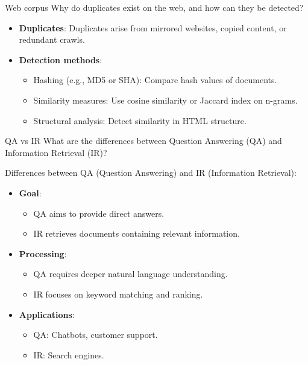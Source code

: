 \documentclass{article}
\begin{document}
\begin{exercise}{Web corpus}
  Why do duplicates exist on the web, and how can they be detected?

  \begin{solution}
    \begin{itemize}
        \item \textbf{Duplicates}: Duplicates arise from mirrored websites, copied content, or redundant crawls.
        \item \textbf{Detection methods}:
        \begin{itemize}
            \item Hashing (e.g., MD5 or SHA): Compare hash values of documents.
            \item Similarity measures: Use cosine similarity or Jaccard index on n-grams.
            \item Structural analysis: Detect similarity in HTML structure.
        \end{itemize}
    \end{itemize}
  \end{solution}
\end{exercise}

\begin{exercise}{QA vs IR}
  What are the differences between Question Answering (QA) and Information Retrieval (IR)?

  \begin{solution}
    Differences between QA (Question Answering) and IR (Information Retrieval):
    \begin{itemize}
        \item \textbf{Goal}:
        \begin{itemize}
            \item QA aims to provide direct answers.
            \item IR retrieves documents containing relevant information.
        \end{itemize}
        \item \textbf{Processing}:
        \begin{itemize}
            \item QA requires deeper natural language understanding.
            \item IR focuses on keyword matching and ranking.
        \end{itemize}
        \item \textbf{Applications}:
        \begin{itemize}
            \item QA: Chatbots, customer support.
            \item IR: Search engines.
        \end{itemize}
    \end{itemize}
  \end{solution}
\end{exercise}
\end{document}
